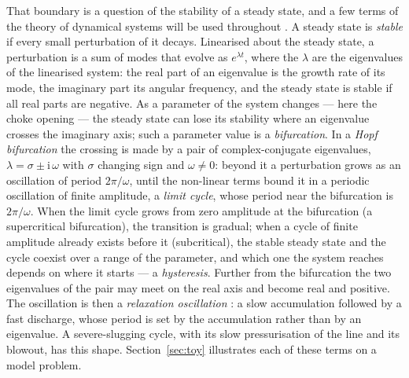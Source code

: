 \documentclass[a4paper,fleqn]{cas-sc}
\begin{document}
That boundary is a question of the stability of a steady state, and a few terms of the theory of dynamical systems will be used throughout \citep{strogatz2024,kuznetsov2004}. A steady state is \emph{stable} if every small perturbation of it decays. Linearised about the steady state, a perturbation is a sum of modes that evolve as $e^{\lambda t}$, where the $\lambda$ are the eigenvalues of the linearised system: the real part of an eigenvalue is the growth rate of its mode, the imaginary part its angular frequency, and the steady state is stable if all real parts are negative. As a parameter of the system changes --- here the choke opening --- the steady state can lose its stability where an eigenvalue crosses the imaginary axis; such a parameter value is a \emph{bifurcation}. In a \emph{Hopf bifurcation} the crossing is made by a pair of complex-conjugate eigenvalues, $\lambda = \sigma \pm \mathrm{i}\,\omega$ with $\sigma$ changing sign and $\omega \neq 0$: beyond it a perturbation grows as an oscillation of period $2\pi/\omega$, until the non-linear terms bound it in a periodic oscillation of finite amplitude, a \emph{limit cycle}, whose period near the bifurcation is $2\pi/\omega$. When the limit cycle grows from zero amplitude at the bifurcation (a supercritical bifurcation), the transition is gradual; when a cycle of finite amplitude already exists before it (subcritical), the stable steady state and the cycle coexist over a range of the parameter, and which one the system reaches depends on where it starts --- a \emph{hysteresis}. Further from the bifurcation the two eigenvalues of the pair may meet on the real axis and become real and positive. The oscillation is then a \emph{relaxation oscillation} \citep{vanderpol1926}: a slow accumulation followed by a fast discharge, whose period is set by the accumulation rather than by an eigenvalue. A severe-slugging cycle, with its slow pressurisation of the line and its blowout, has this shape. Section~\ref{sec:toy} illustrates each of these terms on a model problem.
\end{document}
